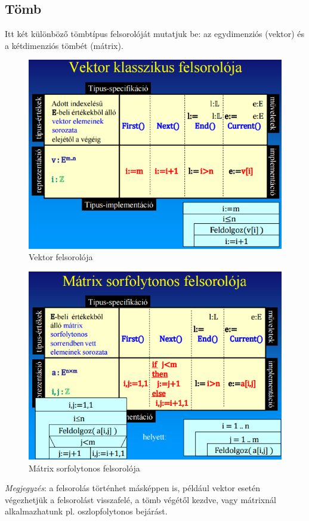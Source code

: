 \documentclass[12pt,margin=0px]{article}
\begin{document}
	\subsection*{Tömb}
	Itt két különböző tömbtípus felsorolóját mutatjuk be: az egydimenziós (vektor) és a kétdimenziós tömbét (mátrix).
	
	\begin{figure}[H]
		\centering
		\includegraphics[width=0.7\linewidth]{img/felsorolo_vektor}
		\caption{Vektor felsorolója}
		\label{fig:felsorolo_vektor}
	\end{figure}
	
	\begin{figure}[H]
		\centering
		\includegraphics[width=0.7\linewidth]{img/felsorolo_matrix}
		\caption{Mátrix sorfolytonos felsorolója}
		\label{fig:felsorolo_matrix}
	\end{figure}
	
    \noindent \emph{Megjegyzés}: a felsorolás történhet másképpen is, például vektor esetén végezhetjük a felsorolást visszafelé, a tömb végétől kezdve, vagy mátrixnál alkalmazhatunk pl. oszlopfolytonos bejárást.
	
\end{document}
